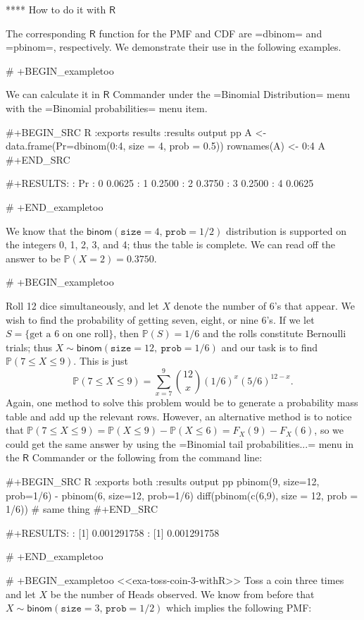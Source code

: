 **** How to do it with \(\mathsf{R}\)

The corresponding \(\mathsf{R}\) function for the PMF and CDF are
=dbinom= and =pbinom=, respectively. We demonstrate their use in the
following examples.

# +BEGIN_exampletoo

We can calculate it in \(\mathsf{R}\) Commander under the =Binomial
Distribution= menu with the =Binomial probabilities= menu item.

#+BEGIN_SRC R :exports results :results output pp
A <- data.frame(Pr=dbinom(0:4, size = 4, prob = 0.5))
rownames(A) <- 0:4 
A
#+END_SRC

#+RESULTS:
:       Pr
: 0 0.0625
: 1 0.2500
: 2 0.3750
: 3 0.2500
: 4 0.0625

# +END_exampletoo

We know that the
\(\mathsf{binom}(\mathtt{size}=4,\,\mathtt{prob}=1/2)\) distribution
is supported on the integers 0, 1, 2, 3, and 4; thus the table is
complete. We can read off the answer to be \(\mathbb{P}(X=2)=0.3750\).

# +BEGIN_exampletoo

Roll 12 dice simultaneously, and let \(X\) denote the number of 6's
that appear. We wish to find the probability of getting seven, eight,
or nine 6's. If we let \(S=\{ \mbox{get a 6 on one roll} \} \), then
\(\mathbb{P}(S)=1/6\) and the rolls constitute Bernoulli trials; thus
\(X\sim\mathsf{binom}(\mathtt{size}=12,\ \mathtt{prob}=1/6)\) and our
task is to find \(\mathbb{P}(7\leq X\leq9)\). This is just
\[ 
\mathbb{P}(7\leq X\leq9)=\sum_{x=7}^{9}{12 \choose x}(1/6)^{x}(5/6)^{12-x}.
\]
Again, one method to solve this problem would be to generate a
probability mass table and add up the relevant rows. However, an
alternative method is to notice that \(\mathbb{P}(7\leq
X\leq9)=\mathbb{P}(X\leq9)-\mathbb{P}(X\leq6)=F_{X}(9)-F_{X}(6)\), so
we could get the same answer by using the =Binomial tail
probabilities...= menu in the \(\mathsf{R}\) Commander or the
following from the command line:

#+BEGIN_SRC R :exports both :results output pp  
pbinom(9, size=12, prob=1/6) - pbinom(6, size=12, prob=1/6)
diff(pbinom(c(6,9), size = 12, prob = 1/6))  # same thing
#+END_SRC

#+RESULTS:
: [1] 0.001291758
: [1] 0.001291758

# +END_exampletoo


# +BEGIN_exampletoo
<<exa-toss-coin-3-withR>> Toss a coin three times and let \(X\) be the
number of Heads observed. We know from before that
\(X\sim\mathsf{binom}(\mathtt{size}=3,\,\mathtt{prob}=1/2)\) which
implies the following PMF:

